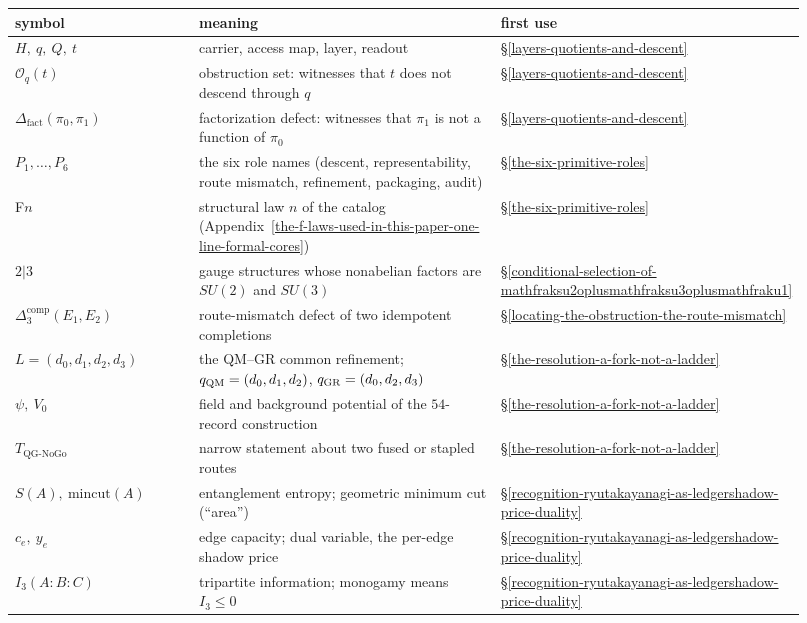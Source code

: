 \documentclass[11pt]{article}
\newcommand{\Deltafact}{\Delta_{\mathrm{fact}}}
\theoremstyle{definition}
\begin{document}
\begin{center}
\small
\begin{longtable}[]{@{}p{0.27\linewidth}p{0.55\linewidth}p{0.1\linewidth}@{}}
\toprule
symbol & meaning & first use\\
\midrule
\endhead
\(H,\ q,\ Q,\ t\) & carrier, access map, layer, readout & \S\ref{layers-quotients-and-descent}\\
\(\mathcal O_q(t)\) & obstruction set: witnesses that \(t\) does not descend through \(q\) & \S\ref{layers-quotients-and-descent}\\
\(\Deltafact(\pi_0,\pi_1)\) & factorization defect: witnesses that \(\pi_1\) is not a function of \(\pi_0\) & \S\ref{layers-quotients-and-descent}\\
\(P_1,\dots,P_6\) & the six role names (descent, representability, route mismatch, refinement, packaging, audit) & \S\ref{the-six-primitive-roles}\\
F\(n\) & structural law \(n\) of the catalog (Appendix~\ref{the-f-laws-used-in-this-paper-one-line-formal-cores}) & \S\ref{the-six-primitive-roles}\\
\(2|3\) & gauge structures whose nonabelian factors are \(SU(2)\) and \(SU(3)\) & \S\ref{conditional-selection-of-mathfraksu2oplusmathfraksu3oplusmathfraku1}\\
\(\Delta_3^{\mathrm{comp}}(E_1,E_2)\) & route-mismatch defect of two idempotent completions & \S\ref{locating-the-obstruction-the-route-mismatch}\\
\(L=(d_0,d_1,d_2,d_3)\) & the QM--GR common refinement; \(q_{\rm QM}=(d_0,d_1,d_2)\), \(q_{\rm GR}=(d_0,d_2,d_3)\) & \S\ref{the-resolution-a-fork-not-a-ladder}\\
\(\psi,\ V_0\) & field and background potential of the \(54\)-record construction & \S\ref{the-resolution-a-fork-not-a-ladder}\\
\(T_{\mathrm{QG\text{-}NoGo}}\) & narrow statement about two fused or stapled routes & \S\ref{the-resolution-a-fork-not-a-ladder}\\
\(S(A),\ \mathrm{mincut}(A)\) & entanglement entropy; geometric minimum cut (``area'') & \S\ref{recognition-ryutakayanagi-as-ledgershadow-price-duality}\\
\(c_e,\ y_e\) & edge capacity; dual variable, the per-edge shadow price & \S\ref{recognition-ryutakayanagi-as-ledgershadow-price-duality}\\
\(I_3(A{:}B{:}C)\) & tripartite information; monogamy means \(I_3\le0\) & \S\ref{recognition-ryutakayanagi-as-ledgershadow-price-duality}\\

\end{longtable}
\end{center}
\end{document}
